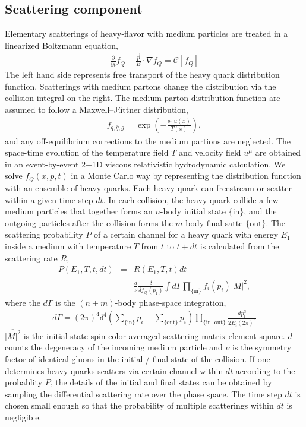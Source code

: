 \documentclass[aps, prc, reprint, amsmath, groupedaddress, nofootinbib]{revtex4-1}
\begin{document}
\subsection{Scattering component}
Elementary scatterings of heavy-flavor with medium particles are treated in a linearized Boltzmann equation,
\begin{eqnarray}
  \frac{\partial}{\partial t}f_Q - \frac{\vec{p}}{E}\cdot\nabla f_Q  = 
\mathcal{C}[f_Q]
\end{eqnarray}
The left hand side represents free transport of the heavy quark distribution function. 
Scatterings with medium partons change the distribution via the collision integral on the right.
The medium parton distribution function are assumed to follow a Maxwell--J\"uttner distribution, 
\begin{eqnarray}
f_{q,\bar{q}, g} = \exp\left(-\frac{p \cdot u(x)}{T(x)}\right),
\end{eqnarray}
and any off-equilibrium corrections to the medium partions are neglected.
The space-time evolution of the temperature field $T$ and velocity field $u^\mu$ are obtained in an event-by-event 2+1D viscous relativistic hydrodynamic calculation.
We solve $f_Q(x, p, t)$ in a Monte Carlo way by representing the distribution function with an ensemble of heavy quarks.
Each heavy quark can freestream or scatter within a given time step $dt$.
In each collision, the heavy quark collide a few medium particles that together forms an $n$-body initial state $\{\textrm{in}\}$, and the outgoing particles after the collision forms the $m$-body final satte $\{\textrm{out}\}$.
The scattering probability $P$ of a certain channel for a heavy quark with energy $E_1$ inside a medium with temperature $T$ from $t$ to $t+dt$ is calculated from the scattering rate $R$,
\begin{eqnarray}\label{eq:rate}
    P(E_1,T,t,dt) &=& R(E_1, T, t) dt \\
    &=& \frac{d}{\nu} \frac{\delta}{\delta f_Q(p_1)}\int d \Gamma \prod_{\textrm{\{in\}}} f_i(p_i) 
\overline{|M|^2},
  	 \nonumber
\end{eqnarray}
where the $d\Gamma$ is the $(n+m)$-body phase-space integration,
\begin{eqnarray}
\nonumber
d\Gamma = (2\pi)^4\delta^4\left(\sum_{\textrm{\{in\}}}p_{i} - \sum_{\textrm{\{out\}}}p_{i}\right)\prod_{\{\textrm{in, out}\}} \frac{dp_i^3}{2E_i(2\pi)^3} 
\end{eqnarray}
$\overline{|M|^2}$ is the initial state spin-color averaged scattering matrix-element square.
$d$ counts the degeneracy of the incoming medium particle and $\nu$ is the symmetry factor of identical gluons in the initial / final state of the collision.
If one determines heavy quarks scatters via certain channel within $dt$ according to the probablity $P$, the details of the initial and final states can be obtained by sampling the differential scattering rate over the phase space.
The time step $dt$ is chosen small enough so that the probability of multiple scatterings within $dt$ is negligible. 
\end{document}
